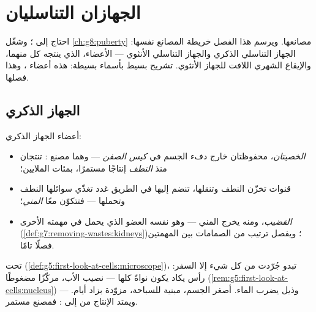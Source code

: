 \chapter{الجهازان التناسليان}\label{ch:g8:reproductive-systems}

احتاج  إلى ؛
وشغّل \cref{ch:g8:puberty} مصانعها. ويرسم هذا الفصل
خريطة المصانع نفسها: الجهاز التناسلي الذكري والجهاز
التناسلي الأنثوي --- الأعضاء،  الذي ينتجه كل
منهما، والإيقاع الشهري اللافت للجهاز الأنثوي. تشريح
بسيط بأسماء بسيطة: هذه أعضاء  ، وهذا
فصلها.

\section{الجهاز الذكري}

\begin{definition}\label{def:g8:reproductive-systems:male}
أعضاء الجهاز الذكري:
\begin{itemize}
  \item \emph{الخصيتان}، محفوظتان خارج دفء
        الجسم في \emph{كيس الصفن} --- وهما مصنع :
        تنتجان منذ  \emph{النطف} إنتاجًا
        مستمرًا، بمئات الملايين؛
  \item قنوات تخزّن النطف وتنقلها، تنضم إليها في الطريق
        غدد تغذّي سوائلها النطف وتحملها --- فتتكوّن معًا
        \emph{المني}؛
  \item \emph{القضيب}، ومنه يخرج المني ---
        وهو نفسه العضو الذي يحمل  في مهمته الأخرى
        (\cref{def:g7:removing-wastes:kidneys})؛ ويفصل
        ترتيب من الصمامات بين المهمتين فصلًا تامًا.
\end{itemize}
\end{definition}

\begin{example}\label{ex:g8:reproductive-systems:sperm}
تحت 
(\cref{def:g5:first-look-at-cells:microscope})، تبدو
  جُرّدت من كل شيء إلا السفر: رأس يكاد يكون
نواةً كلها --- نصيب الأب، مركّزًا مضغوطًا
(\cref{rem:g5:first-look-at-cells:nucleus}) --- وذيل
يضرب الماء. أصغر  الجسم، مبنية للسباحة، مزوّدة بزاد
أيام. ويمتد الإنتاج من  إلى : فمصنع 
مستمر.
\end{example}


